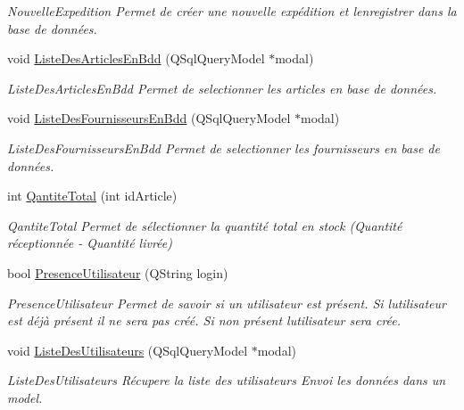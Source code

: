 \begin{DoxyCompactItemize}
\begin{DoxyCompactList}\small\item\em Nouvelle\+Expedition Permet de créer une nouvelle expédition et l\textquotesingle{}enregistrer dans la base de données. \end{DoxyCompactList}\item 
void \mbox{\hyperlink{class_database_ab2c30b7afdf7bfd699a142739c66e447}{Liste\+Des\+Articles\+En\+Bdd}} (Q\+Sql\+Query\+Model $\ast$modal)
\begin{DoxyCompactList}\small\item\em Liste\+Des\+Articles\+En\+Bdd Permet de selectionner les articles en base de données. \end{DoxyCompactList}\item 
void \mbox{\hyperlink{class_database_addce242de8b2dd4ad9c4f2cde7e8da0a}{Liste\+Des\+Fournisseurs\+En\+Bdd}} (Q\+Sql\+Query\+Model $\ast$modal)
\begin{DoxyCompactList}\small\item\em Liste\+Des\+Fournisseurs\+En\+Bdd Permet de selectionner les fournisseurs en base de données. \end{DoxyCompactList}\item 
int \mbox{\hyperlink{class_database_a4dcaf727e1e1c241b6f89d398e16c69a}{Qantite\+Total}} (int id\+Article)
\begin{DoxyCompactList}\small\item\em Qantite\+Total Permet de sélectionner la quantité total en stock (Quantité réceptionnée -\/ Quantité livrée) \end{DoxyCompactList}\item 
bool \mbox{\hyperlink{class_database_ae3a05f4ff6839161f54465b4a67cf7d8}{Presence\+Utilisateur}} (Q\+String login)
\begin{DoxyCompactList}\small\item\em Presence\+Utilisateur Permet de savoir si un utilisateur est présent. Si l\textquotesingle{}utilisateur est déjà présent il ne sera pas créé. Si non présent l\textquotesingle{}utilisateur sera crée. \end{DoxyCompactList}\item 
void \mbox{\hyperlink{class_database_a8ac8ec409038c20334f6217a3ac20f3b}{Liste\+Des\+Utilisateurs}} (Q\+Sql\+Query\+Model $\ast$modal)
\begin{DoxyCompactList}\small\item\em Liste\+Des\+Utilisateurs Récupere la liste des utilisateurs Envoi les données dans un model. \end{DoxyCompactList}\item 

\end{DoxyCompactItemize}
